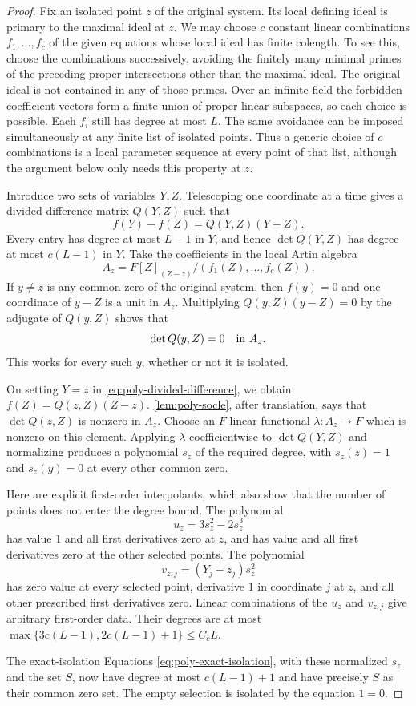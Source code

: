 \begin{proof}
Fix an isolated point $z$ of the original system.  Its local defining ideal is primary to the maximal ideal at $z$.  We may choose $c$ constant linear combinations $f_1,\ldots,f_c$ of the given equations whose local ideal has finite colength.  To see this, choose the combinations successively, avoiding the finitely many minimal primes of the preceding proper intersections other than the maximal ideal.  The original ideal is not contained in any of those primes.  Over an infinite field the forbidden coefficient vectors form a finite union of proper linear subspaces, so each choice is possible.  Each $f_i$ still has degree at most $L$.  The same avoidance can be imposed simultaneously at any finite list of isolated points.  Thus a generic choice of $c$ combinations is a local parameter sequence at every point of that list, although the argument below only needs this property at $z$.

Introduce two sets of variables $Y,Z$.  Telescoping one coordinate at a time gives a divided-difference matrix $Q(Y,Z)$ such that
\begin{equation}\label{eq:poly-divided-difference}
 f(Y)-f(Z)=Q(Y,Z)(Y-Z).
\end{equation}
Every entry has degree at most $L-1$ in $Y$, and hence $\det Q(Y,Z)$ has degree at most $c(L-1)$ in $Y$.  Take the coefficients in the local Artin algebra
\[
 A_z=F[Z]_{(Z-z)}/(f_1(Z),\ldots,f_c(Z)).
\]
If $y\ne z$ is any common zero of the original system, then $f(y)=0$ and one coordinate of $y-Z$ is a unit in $A_z$.  Multiplying $Q(y,Z)(y-Z)=0$ by the adjugate of $Q(y,Z)$ shows that
\[
 \det Q(y,Z)=0\quad\hbox{in }A_z.
\]
This works for every such $y$, whether or not it is isolated.

On setting $Y=z$ in \eqref{eq:poly-divided-difference}, we obtain $f(Z)=Q(z,Z)(Z-z)$.  \cref{lem:poly-socle}, after translation, says that $\det Q(z,Z)$ is nonzero in $A_z$.  Choose an $F$-linear functional $\lambda:A_z\longrightarrow F$ which is nonzero on this element. Applying $\lambda$ coefficientwise to $\det Q(Y,Z)$ and normalizing produces a polynomial $s_z$ of the required degree, with $s_z(z)=1$ and $s_z(y)=0$ at every other common zero.

Here are explicit first-order interpolants, which also show that the number of points does not enter the degree bound.  The polynomial
\[
 u_z=3s_z^2-2s_z^3
\]
has value $1$ and all first derivatives zero at $z$, and has value and all first derivatives zero at the other selected points.  The polynomial
\[
 v_{z,j}=(Y_j-z_j)s_z^2
\]
has zero value at every selected point, derivative $1$ in coordinate $j$ at $z$, and all other prescribed first derivatives zero.  Linear combinations of the $u_z$ and $v_{z,j}$ give arbitrary first-order data. Their degrees are at most $\max\{3c(L-1),2c(L-1)+1\}\le C_cL$.

The exact-isolation Equations \eqref{eq:poly-exact-isolation}, with these normalized $s_z$ and the set $S$, now have degree at most $c(L-1)+1$ and have precisely $S$ as their common zero set.  The empty selection is isolated by the equation $1=0$.
\end{proof}

